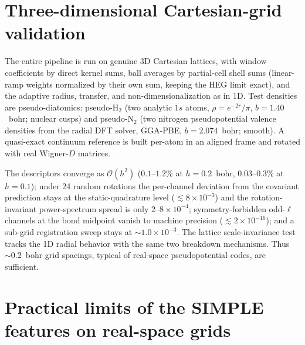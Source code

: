 \section{Three-dimensional Cartesian-grid validation}
\label{app:3d}

The entire pipeline is run on genuine 3D Cartesian lattices, with window
coefficients by direct kernel sums, ball averages by partial-cell shell sums
(linear-ramp weights normalized by their own sum, keeping the HEG limit exact),
and the adaptive radius, transfer, and non-dimensionalization as in 1D. Test
densities are pseudo-diatomics: pseudo-H$_2$ (two analytic $1s$ atoms,
$\rho=e^{-2r}/\pi$, $b=1.40$~bohr; nuclear cusps) and pseudo-N$_2$ (two nitrogen
pseudopotential valence densities from the radial DFT solver, GGA-PBE,
$b=2.074$~bohr; smooth). A quasi-exact continuum reference is built per-atom in an
aligned frame and rotated with real Wigner-$D$ matrices.

The descriptors converge as $\mathcal O(h^2)$ ($0.1$--$1.2\%$ at $h=0.2$~bohr,
$0.03$--$0.3\%$ at $h=0.1$); under 24 random rotations the per-channel deviation
from the covariant prediction stays at the static-quadrature level
($\lesssim8\times10^{-3}$) and the rotation-invariant power-spectrum spread is only
$2$--$8\times10^{-4}$; symmetry-forbidden odd-$\ell$ channels at the bond midpoint
vanish to machine precision ($\lesssim2\times10^{-16}$); and a sub-grid registration
sweep stays at $\sim\!1.0\times10^{-3}$. The lattice scale-invariance test tracks the 1D radial behavior
with the same two breakdown mechanisms. Thus $\sim0.2$~bohr grid spacings, typical
of real-space pseudopotential codes, are sufficient.

\section{Practical limits of the SIMPLE features on real-space grids}
\label{app:stress}

